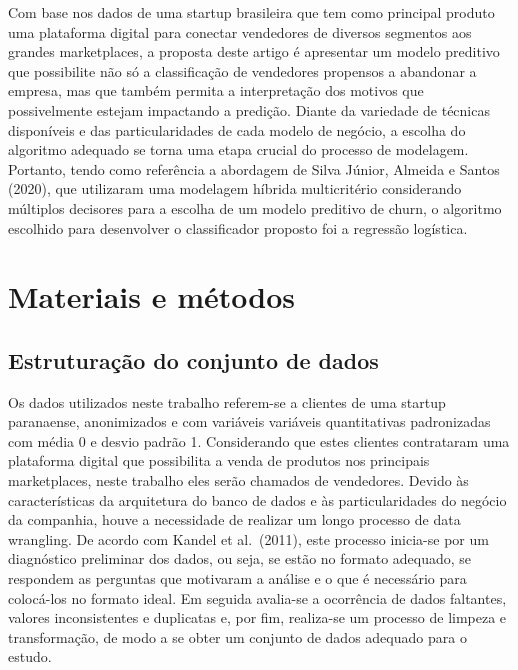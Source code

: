 \documentclass[twocolumn]{rbef}
\newcommand{\1}{\mathbbm{1}}
\begin{document}
Com base nos dados de uma startup brasileira que tem como principal produto uma plataforma digital para conectar vendedores de diversos segmentos aos grandes marketplaces, a proposta deste artigo é apresentar um modelo preditivo que possibilite não só a classificação de vendedores propensos a abandonar a empresa, mas que também permita a interpretação dos motivos que possivelmente estejam impactando a predição. Diante da variedade de técnicas disponíveis e das particularidades de cada modelo de negócio, a escolha do algoritmo adequado se torna uma etapa crucial do processo de modelagem. Portanto, tendo como referência a abordagem de Silva Júnior, Almeida e Santos (2020), que utilizaram uma modelagem híbrida multicritério considerando múltiplos decisores para a escolha de um modelo preditivo de churn, o algoritmo escolhido para desenvolver o classificador proposto foi a regressão logística.

\hypertarget{materiais-e-muxe9todos}{%
\section{Materiais e métodos}\label{materiais-e-muxe9todos}}

\hypertarget{estruturauxe7uxe3o-do-conjunto-de-dados}{%
\subsection{Estruturação do conjunto de dados}\label{estruturauxe7uxe3o-do-conjunto-de-dados}}

Os dados utilizados neste trabalho referem-se a clientes de uma startup paranaense, anonimizados e com variáveis variáveis quantitativas padronizadas com média 0 e desvio padrão 1. Considerando que estes clientes contrataram uma plataforma digital que possibilita a venda de produtos nos principais marketplaces, neste trabalho eles serão chamados de vendedores. Devido às características da arquitetura do banco de dados e às particularidades do negócio da companhia, houve a necessidade de realizar um longo processo de data wrangling. De acordo com Kandel et al.~(2011), este processo inicia-se por um diagnóstico preliminar dos dados, ou seja, se estão no formato adequado, se respondem as perguntas que motivaram a análise e o que é necessário para colocá-los no formato ideal. Em seguida avalia-se a ocorrência de dados faltantes, valores inconsistentes e duplicatas e, por fim, realiza-se um processo de limpeza e transformação, de modo a se obter um conjunto de dados adequado para o estudo.
\end{document}
